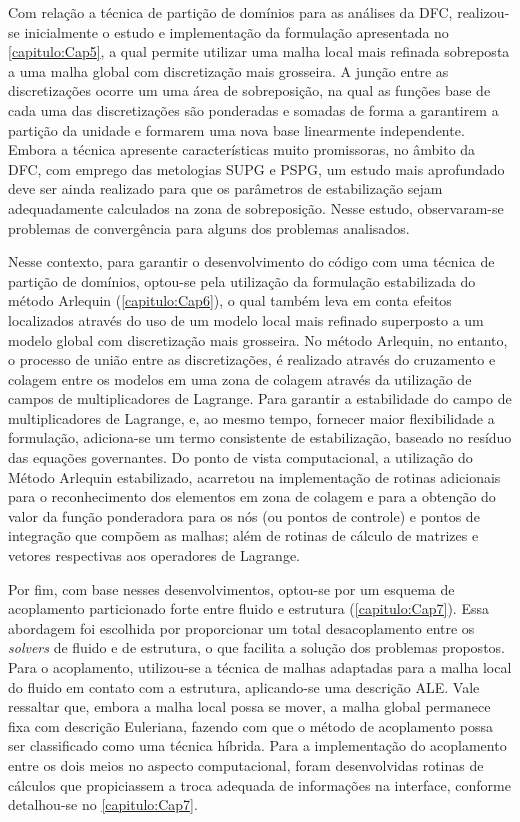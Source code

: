 Com relação a técnica de partição de domínios para as análises da DFC, realizou-se inicialmente o estudo e implementação da formulação apresentada no \autoref{capitulo:Cap5}, a qual permite utilizar uma malha local mais refinada sobreposta a uma malha global com discretização mais grosseira. A junção entre as discretizações ocorre um uma área de sobreposição, na qual as funções base de cada uma das discretizações são ponderadas e somadas de forma a garantirem a partição da unidade e formarem uma nova base linearmente independente. Embora a técnica apresente características muito promissoras, no âmbito da DFC, com emprego das metologias SUPG e PSPG, um estudo mais aprofundado deve ser ainda realizado para que os parâmetros de estabilização sejam adequadamente calculados na zona de sobreposição. Nesse estudo, observaram-se problemas de convergência para alguns dos problemas analisados.

Nesse contexto, para garantir o desenvolvimento do código com uma técnica de partição de domínios, optou-se pela utilização da formulação estabilizada do método Arlequin (\autoref{capitulo:Cap6}), o qual também leva em conta efeitos localizados através do uso de um modelo local mais refinado superposto a um modelo global com discretização mais grosseira. No método Arlequin, no entanto, o processo de união entre as discretizações, é realizado através do cruzamento e colagem entre os modelos em uma zona de colagem através da utilização de campos de multiplicadores de Lagrange. Para garantir a estabilidade do campo de multiplicadores de Lagrange, e, ao mesmo tempo, fornecer maior flexibilidade a formulação, adiciona-se um termo consistente de estabilização, baseado no resíduo das equações governantes. Do ponto de vista computacional, a utilização do Método Arlequin estabilizado, acarretou na implementação de rotinas adicionais para o reconhecimento dos elementos em zona de colagem e para a obtenção do valor da função ponderadora para os nós (ou pontos de controle) e pontos de integração que compõem as malhas; além de rotinas de cálculo de matrizes e vetores respectivas aos operadores de Lagrange.

Por fim, com base nesses desenvolvimentos, optou-se por um esquema de acoplamento particionado forte entre fluido e estrutura (\autoref{capitulo:Cap7}). Essa abordagem foi escolhida por proporcionar um total desacoplamento entre os \textit{solvers} de fluido e de estrutura, o que facilita a solução dos problemas propostos. Para o acoplamento, utilizou-se a técnica de malhas adaptadas para a malha local do fluido em contato com a estrutura, aplicando-se uma descrição ALE. Vale ressaltar que, embora a malha local possa se mover, a malha global permanece fixa com descrição Euleriana, fazendo com que o método de acoplamento possa ser classificado como uma técnica híbrida. Para a implementação do acoplamento entre os dois meios no aspecto computacional, foram desenvolvidas rotinas de cálculos que propiciassem a troca adequada de informações na interface, conforme detalhou-se no \autoref{capitulo:Cap7}. 

